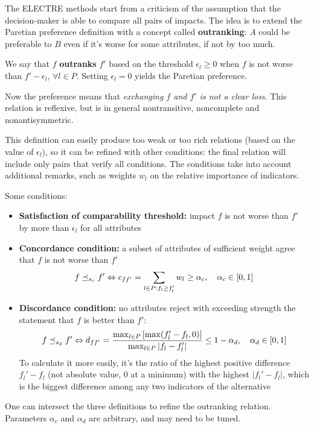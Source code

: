 The ELECTRE methods start from a criticism of the assumption that the decision-maker is able to compare all pairs of impacts. The idea is to extend the Paretian preference definition with a concept called \textbf{outranking}: $A$ could be preferable to $B$ even if it's worse for some attributes, if not by too much.

We say that $f$ \textbf{outranks} $f'$ based on the threshold $\epsilon_l \geq 0$ when $f$ is not worse than $f' - \epsilon_l$, $\forall l \in P$. Setting $\epsilon_l = 0$ yields the Paretian preference. 

Now the preference means that \textit{exchanging $f$ and $f'$ is not a clear loss}. This relation is reflexive, but is in general nontransitive, noncomplete and nonantisymmetric.

This definition can easily produce too weak or too rich relations (based on the value of $\epsilon_l$), so it can be refined with other conditions: the final relation will include only pairs that verify all conditions. The conditions take into account additional remarks, such as weights $w_l$ on the relative importance of indicators.

Some conditions: 
\begin{itemize}
	\item \textbf{Satisfaction of comparability threshold:} impact $f$ is not worse than $f'$ by more than $\epsilon_l$ for all attributes
	
	\item \textbf{Concordance condition:} a subset of attributes of sufficient weight agree that $f$ is not worse than $f'$
	$$ f \preceq_{s_c} f' \Leftrightarrow c_{ff'} = \sum_{l \in P: f_l \geq f_l'} w_l \geq \alpha_c, \quad \alpha_c \in [0,1] $$
	
	\item \textbf{Discordance condition:} no attributes reject with exceeding strength the statement that $f$ is better than $f'$:
	$$ f \preceq_{s_d} f' \Leftrightarrow d_{ff'} = \frac{\max_{l \in P} \left[\max (f_l' - f_l, 0)\right]}{\max_{l \in P} |f_l - f_l'|} \leq 1 - \alpha_d, \quad \alpha_d \in [0,1] $$
    To calculate it more easily, it's the ratio of the highest positive difference $f_l' - f_l$ (not absolute value, 0 at a minimum) with the highest $|f_l' - f_l|$, which is the biggest difference among any two indicators of the alternative
\end{itemize}
One can intersect the three definitions to refine the outranking relation. Parameters $\alpha_c$  and $\alpha_d$ are arbitrary, and may need to be tuned.

